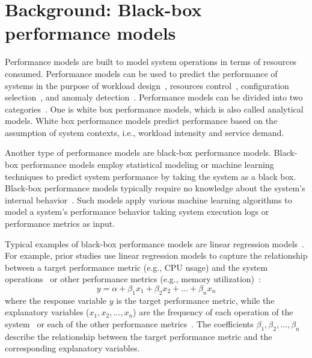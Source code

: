 \section{Background: Black-box performance models} \label{sec:background}


Performance models are built to model
system operations
in terms of resources consumed. Performance models can be used to predict the performance of systems in the purpose of workload design~\citep{DBLP:journals/tse/KrishnamurthyRM06,DBLP:conf/fast/YadwadkarBGNS10,DBLP:journals/ase/SyerSJH17}, resources control~\citep{DBLP:conf/cnsm/GongGW10,DBLP:conf/sosp/CortezBMRFB17}, configuration selection~\citep{DBLP:conf/kbse/GuoCASW13,DBLP:conf/wosp/ValovPGFC17,DBLP:journals/ese/GuoYSASVCWY18}, and anomaly detection~\citep{DBLP:journals/csur/IbidunmoyeHE15,DBLP:conf/issre/FarshchiSWG15,DBLP:journals/stvr/GhaithWPJOM16}. Performance models can be divided into two categories~\citep{DBLP:conf/wosp/DidonaQRT15}. One is white box performance models, which is also called analytical models. White box performance models predict performance based on the assumption of system contexts, i.e., workload intensity and service demand.

Another type of performance models are black-box performance models. Black-box performance models employ statistical modeling or machine learning techniques to predict system performance by taking the system as a black box.
Black-box performance models typically require no knowledge about the system's internal behavior~\citep{DBLP:conf/wosp/DidonaQRT15,DBLP:conf/icst/GaoJBL16}. Such models apply various machine learning algorithms to model a system's performance behavior taking system execution logs or performance metrics as input. 

Typical examples of black-box performance models are linear regression models~\citep{DBLP:conf/wosp/ShangHNF15, Yao:2018:LSL:3184407.3184416}. 
For example, prior studies use linear regression models to capture the relationship between a target performance metric (e.g., CPU usage) and the system operations~\citep{Yao:2018:LSL:3184407.3184416} or other performance metrics (e.g., memory utilization)~\citep{DBLP:conf/wosp/ShangHNF15}:
\begin{equation}
y=\alpha + \beta_1 x_1 + \beta_2 x_2+...+\beta_n x_n
\end{equation}
where the response variable $y$ is the target performance metric, while the explanatory variables ($x_1,x_2,...,x_n$) are the frequency of each operation of the system~\citep{Yao:2018:LSL:3184407.3184416} or each of the other performance metrics~\citep{DBLP:conf/wosp/ShangHNF15}.
The coefficients $\beta_1,\beta_2,...,\beta_n$ describe the relationship between the target performance metric and the corresponding explanatory variables.  

